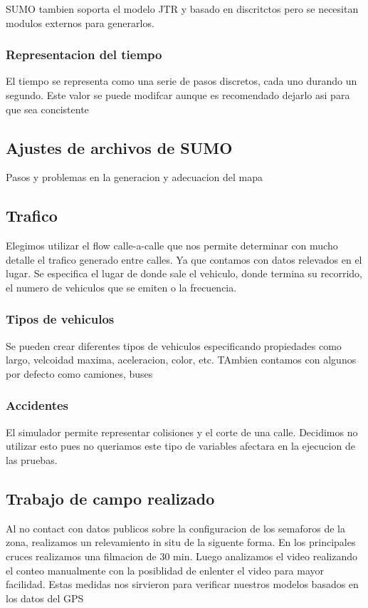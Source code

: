 SUMO tambien soporta el modelo JTR y basado en discritctos pero se necesitan modulos externos para generarlos.

\subsubsection{Representacion del tiempo}
El tiempo se representa como una serie de pasos discretos, cada uno durando un segundo. Este valor se puede modifcar aunque es recomendado dejarlo asi para que sea concistente


\subsection{Ajustes de archivos de SUMO}
Pasos y problemas en la generacion y adecuacion del mapa

\subsection{Trafico}
Elegimos utilizar el flow calle-a-calle que nos permite determinar con mucho detalle el trafico generado entre calles. Ya que contamos con datos relevados en el lugar. Se especifica el lugar de donde sale el vehiculo, donde termina su recorrido, el numero de vehiculos que se emiten o la frecuencia.

\subsubsection{Tipos de vehiculos}
Se pueden crear diferentes tipos de vehiculos especificando propiedades como largo, velcoidad maxima,  aceleracion, color, etc. TAmbien contamos con algunos por defecto como camiones, buses

\subsubsection{Accidentes}
El simulador permite representar colisiones y el corte de una calle. Decidimos no utilizar esto pues no queriamos este tipo de variables afectara en la ejecucion de las pruebas.

\subsection{Trabajo de campo realizado}
Al no contact con datos publicos sobre la configuracion de los semaforos de la zona, realizamos un relevamiento in situ de la siguente forma.
En los principales cruces realizamos una filmacion de 30 min. Luego analizamos el video realizando el conteo manualmente con la posiblidad de enlenter el video para mayor facilidad.
Estas medidas nos sirvieron para verificar nuestros modelos basados en los datos del GPS 

